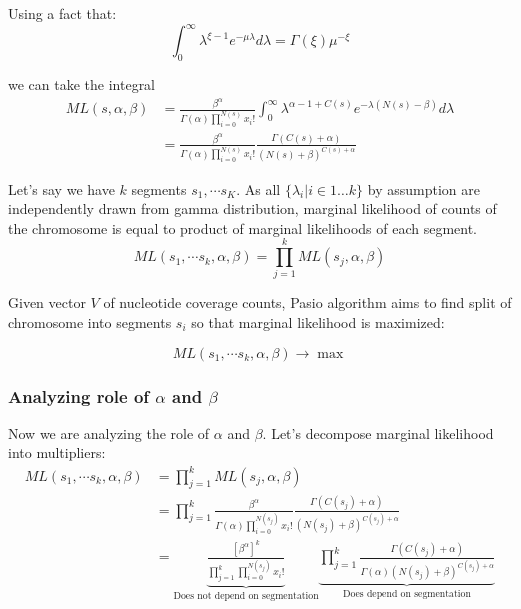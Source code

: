 \documentclass[10pt,letterpaper]{article}
\begin{document}
Using a fact that:
$$
\int _0 ^{\infty}  \lambda^{\xi-1} e^{-\mu\lambda}d\lambda = \Gamma(\xi) \mu^{-\xi}
$$

we can take the integral
\begin{align}\label{eq:segmentML}
    ML(s, \alpha, \beta) & =
    \frac {\beta^\alpha} {\Gamma(\alpha) \prod _{i=0} ^{N(s)} x_i!} \int _{0} ^{\infty} \lambda^{\alpha-1+C(s)}  {e^{-\lambda(N(s)-\beta)} } d\lambda \\
    & = 
    \frac {\beta^\alpha} {\Gamma(\alpha) \prod _{i=0} ^{N(s)} x_i!} \frac {\Gamma(C(s)+\alpha)} {(N(s)+\beta)^{C(s)+\alpha}} 
\end{align}

Let's say we have $k$ segments $s_1, \cdots s_K$. As all $\{\lambda_i | i \in 1 \dots k\}$ by assumption are independently drawn from gamma distribution,
marginal likelihood of counts of the chromosome is equal to product of marginal likelihoods of each segment.
\begin{equation}\label{eq:fullML}
ML(s_1, \cdots s_k, \alpha, \beta) = \prod _{j=1} ^{k} ML(s_j, \alpha, \beta)     
\end{equation}

Given vector $V$ of nucleotide coverage counts, Pasio algorithm aims to find split of chromosome into segments $s_i$
so that marginal likelihood is maximized:

$$ML(s_1, \cdots s_k, \alpha, \beta) \rightarrow \max$$

\subsubsection{Analyzing role of $\alpha$ and $\beta$}

Now we are analyzing the role of $\alpha$ and $\beta$.
Let's decompose marginal likelihood into multipliers:
\begin{align*}
    ML(s_1, \cdots s_k, \alpha, \beta) & = \prod _{j=1} ^{k} ML(s_j, \alpha, \beta) \\
    & = 
    \prod _{j=1} ^{k} \frac {\beta^\alpha} {\Gamma(\alpha) \prod _{i=0} ^{N(s_j)} x_i!} \frac {\Gamma(C(s_j)+\alpha)} {(N(s_j)+\beta)^{C(s_j)+\alpha}} \\
    & = 
    \underbrace {\frac {\left[\beta^{\alpha}\right]^k} {\prod _{j=1} ^{k} \prod _{i=0} ^{N(s_j)} x_i!}}_{\text{Does not depend on segmentation}}
    \underbrace {\prod _{j=1} ^{k}  \frac {\Gamma(C(s_j)+\alpha)} {\Gamma(\alpha)(N(s_j)+\beta)^{C(s_j)+\alpha}} }_{\text{Does depend on segmentation}}
\end{align*}
\end{document}
